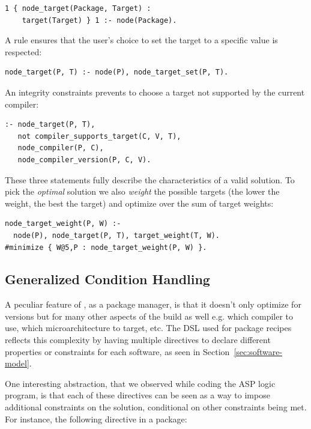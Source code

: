 \begin{verbatim}
1 { node_target(Package, Target) :
    target(Target) } 1 :- node(Package).
\end{verbatim}

A rule ensures that the user's choice to set the target to a specific value is respected:

\begin{verbatim}
node_target(P, T) :- node(P), node_target_set(P, T).
\end{verbatim}

An integrity constraints prevents to choose a target not supported by the current compiler:

\begin{verbatim}
:- node_target(P, T),
   not compiler_supports_target(C, V, T),
   node_compiler(P, C),
   node_compiler_version(P, C, V).
\end{verbatim}

These three statements fully describe the characteristics of a valid solution. To pick the \emph{optimal} solution we also \emph{weight} the possible targets
(the lower the weight, the best the target) and optimize over the sum of target weights:

\begin{verbatim}
node_target_weight(P, W) :-
  node(P), node_target(P, T), target_weight(T, W).
#minimize { W@5,P : node_target_weight(P, W) }.
\end{verbatim}

\subsection{Generalized Condition Handling}
\label{subsec:generalizedcond}
A peculiar feature of \spack, as a package manager, is that it doesn't only optimize for versions but for many other aspects of the build as well e.g. which compiler to use, which microarchitecture to target, etc.
The DSL used for package recipes reflects this complexity by having multiple directives to declare different properties or constraints for each software, as seen in Section~\ref{sec:software-model}.

One interesting abstraction, that we observed while coding the ASP logic program, is that each of these directives can be seen as a way to impose additional constraints on the solution, conditional on other constraints
being met. For instance, the following directive in a package:


